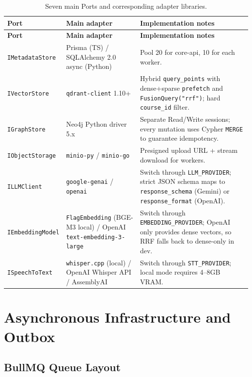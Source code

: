 \begin{longtable}{|p{3.3cm}|p{4cm}|p{6.2cm}|}
\caption{Seven main Ports and corresponding adapter libraries.}
\label{tab:adapter-overview} \\
\hline
\textbf{Port} & \textbf{Main adapter} & \textbf{Implementation notes} \\
\hline
\endfirsthead
\hline
\textbf{Port} & \textbf{Main adapter} & \textbf{Implementation notes} \\
\hline
\endhead

\texttt{IMetadataStore}
    & Prisma (TS) / SQLAlchemy 2.0 async (Python)
    & Pool 20 for core-api, 10 for each worker. \\
\hline
\texttt{IVectorStore}
    & \texttt{qdrant-client} 1.10+
    & Hybrid \texttt{query\_points} with dense+sparse
      \texttt{prefetch} and \texttt{FusionQuery("rrf")}; hard
      \texttt{course\_id} filter. \\
\hline
\texttt{IGraphStore}
    & Neo4j Python driver 5.x
    & Separate Read/Write sessions; every mutation uses Cypher
      \texttt{MERGE} to guarantee idempotency. \\
\hline
\texttt{IObjectStorage}
    & \texttt{minio-py} / \texttt{minio-go}
    & Presigned upload URL + stream download for workers. \\
\hline
\texttt{ILLMClient}
    & \texttt{google-genai} / \texttt{openai}
    & Switch through \texttt{LLM\_PROVIDER}; strict JSON schema maps to
      \texttt{response\_schema} (Gemini) or \texttt{response\_format}
      (OpenAI). \\
\hline
\texttt{IEmbeddingModel}
    & \texttt{FlagEmbedding} (BGE-M3 local) / OpenAI
      \texttt{text-embedding-}\allowbreak\texttt{3-large}
    & Switch through \texttt{EMBEDDING\_PROVIDER}; OpenAI only provides
      dense vectors, so RRF falls back to dense-only in dev. \\
\hline
\texttt{ISpeechToText}
    & \texttt{whisper.cpp} (local) / OpenAI Whisper API /
      AssemblyAI
    & Switch through \texttt{STT\_PROVIDER}; local mode requires
      4--8GB VRAM. \\
\hline
\end{longtable}

\section{Asynchronous Infrastructure and Outbox}
\label{sec:async-impl}

\subsection{BullMQ Queue Layout}

